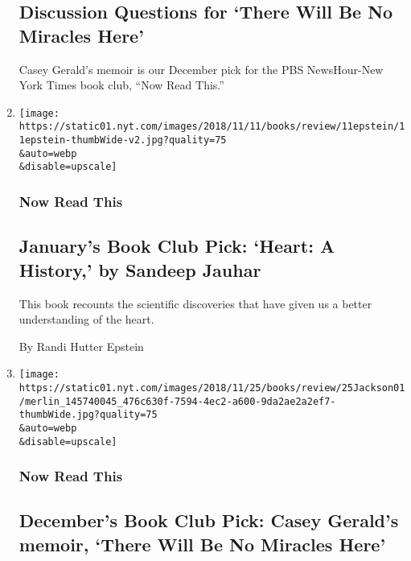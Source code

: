 \begin{enumerate}
  \hypertarget{discussion-questions-for-there-will-be-no-miracles-here}{%
  \subsection{Discussion Questions for `There Will Be No Miracles
  Here'}\label{discussion-questions-for-there-will-be-no-miracles-here}}

  Casey Gerald's memoir is our December pick for the PBS NewsHour-New
  York Times book club, ``Now Read This.''
\item
  \href{/2018/11/05/books/review/heart-sandeep-jauhar.html}{}

  \texttt{[image: https://static01.nyt.com/images/2018/11/11/books/review/11epstein/11epstein-thumbWide-v2.jpg?quality=75\\\&auto=webp\\\&disable=upscale]}

  \hypertarget{now-read-this-7}{%
  \subsubsection{Now Read This}\label{now-read-this-7}}

  \hypertarget{januarys-book-club-pick-heart-a-history-by-sandeep-jauhar}{%
  \subsection{January's Book Club Pick: `Heart: A History,' by Sandeep
  Jauhar}\label{januarys-book-club-pick-heart-a-history-by-sandeep-jauhar}}

  This book recounts the scientific discoveries that have given us a
  better understanding of the heart.

  By Randi Hutter Epstein
\item
  \href{/2018/10/24/books/review/casey-gerald-memoir-there-will-be-no-miracles-here.html}{}

  \texttt{[image: https://static01.nyt.com/images/2018/11/25/books/review/25Jackson01/merlin\_145740045\_476c630f-7594-4ec2-a600-9da2ae2a2ef7-thumbWide.jpg?quality=75\\\&auto=webp\\\&disable=upscale]}

  \hypertarget{now-read-this-8}{%
  \subsubsection{Now Read This}\label{now-read-this-8}}

  \hypertarget{decembers-book-club-pick-casey-geralds-memoir-there-will-be-no-miracles-here}{%
  \subsection{December's Book Club Pick: Casey Gerald's memoir, `There
  Will Be No Miracles
  Here'}\label{decembers-book-club-pick-casey-geralds-memoir-there-will-be-no-miracles-here}}


\end{enumerate}
